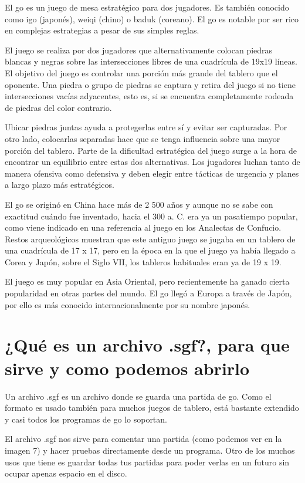 \documentclass[12pt,a4paper]{report}
\begin{document}
El go es un juego de mesa estratégico para dos jugadores. Es también conocido como igo (japonés), weiqi (chino) o baduk (coreano). El go es notable por ser rico en complejas estrategias a pesar de sus simples reglas.

El juego se realiza por dos jugadores que alternativamente colocan piedras blancas y negras sobre las intersecciones libres de una cuadrícula de 19x19 líneas. El objetivo del juego es controlar una porción más grande del tablero que el oponente. Una piedra o grupo de piedras se captura y retira del juego si no tiene intersecciones vacías adyacentes, esto es, si se encuentra completamente rodeada de piedras del color contrario.

Ubicar piedras juntas ayuda a protegerlas entre sí y evitar ser capturadas. Por otro lado, colocarlas separadas hace que se tenga influencia sobre una mayor porción del tablero. Parte de la dificultad estratégica del juego surge a la hora de encontrar un equilibrio entre estas dos alternativas. Los jugadores luchan tanto de manera ofensiva como defensiva y deben elegir entre tácticas de urgencia y planes a largo plazo más estratégicos.

El go se originó en China hace más de 2 500 años y aunque no se sabe con exactitud cuándo fue inventado, hacia el 300 a. C. era ya un pasatiempo popular, como viene indicado en una referencia al juego en los Analectas de Confucio. Restos arqueológicos muestran que este antiguo juego se jugaba en un tablero de una cuadrícula de 17 x 17, pero en la época en la que el juego ya había llegado a Corea y Japón, sobre el Siglo VII, los tableros habituales eran ya de 19 x 19.

El juego es muy popular en Asia Oriental, pero recientemente ha ganado cierta popularidad en otras partes del mundo. El go llegó a Europa a través de Japón, por ello es más conocido internacionalmente por su nombre japonés.





\section{¿Qué es un archivo .sgf?, para que sirve y como podemos abrirlo}\label{sgf}
Un archivo .sgf es un archivo donde se guarda una partida de go. Como el formato es usado también para muchos juegos de tablero, está bastante extendido y casi todos los programas de go lo soportan.


El archivo .sgf nos sirve para comentar una partida (como podemos ver en la imagen 7) y hacer pruebas directamente desde un programa. Otro de los muchos usos que tiene es guardar todas tus partidas para poder verlas en un futuro sin ocupar apenas espacio en el disco. \\ \\
\end{document}
